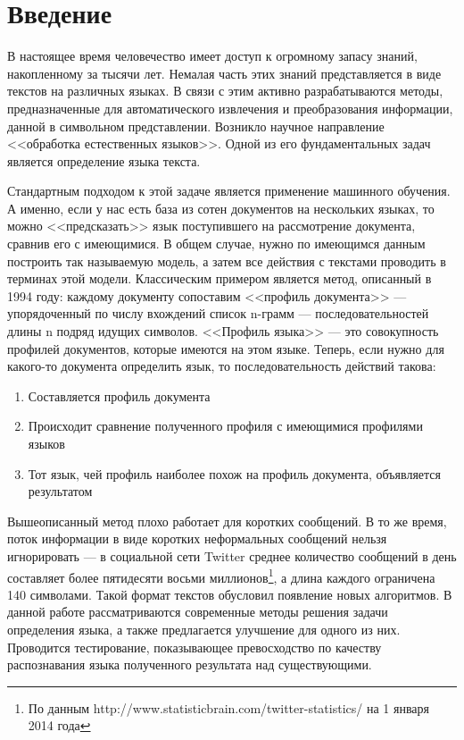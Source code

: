 \documentclass[a4paper, 14pt]{article}
\begin{document}
\newtheorem{definition} {Определение}
\newtheorem{option} {Свойство}
\newtheorem{theorem} {Теорема}


\section{Введение}
	        В настоящее время человечество имеет доступ к огромному запасу знаний, накопленному за тысячи лет. Немалая часть этих знаний представляется
	        в виде текстов на различных языках. В связи с этим активно разрабатываются методы, предназначенные для автоматического извлечения
	        и преобразования информации, данной в символьном представлении. 
	        Возникло научное направление <<обработка естественных языков>>. Одной из его фундаментальных задач является определение языка текста. 


	        Стандартным подходом к этой задаче является применение машинного обучения. А именно, если у нас есть база из сотен документов 
	        на нескольких языках, то можно <<предсказать>> язык поступившего на рассмотрение документа, сравнив его с имеющимися. 
	        В общем случае, нужно по имеющимся данным построить так называемую модель, а затем все действия с текстами проводить в терминах 
	        этой модели. 
	        Классическим примером является метод, описанный в 1994 году: каждому документу сопоставим <<профиль документа>> --- упорядоченный по
	        числу вхождений список n-грамм --- последовательностей длины n подряд идущих символов. <<Профиль языка>> --- это совокупность профилей
	        документов, которые имеются на этом языке. Теперь, если нужно для какого-то документа определить язык, то последовательность
	        действий такова:
	        \begin{enumerate}
	        		\item Составляется профиль документа
	        		\item Происходит сравнение полученного профиля с имеющимися профилями языков
	        		\item Тот язык, чей профиль наиболее похож на профиль документа, объявляется результатом
	        \end{enumerate}
	          
	        Вышеописанный метод плохо работает для коротких сообщений. В то же время, поток информации в виде коротких неформальных сообщений нельзя игнорировать ---
	        в социальной сети Twitter среднее количество сообщений в день составляет более пятидесяти восьми миллионов\footnote{По данным http://www.statisticbrain.com/twitter-statistics/ на 1 января 2014 года}, а длина каждого ограничена 140 символами. 
	        Такой формат текстов обусловил появление новых алгоритмов. В данной работе рассматриваются современные методы 
	        решения задачи определения языка, а также предлагается улучшение для одного из них. Проводится тестирование, показывающее
	        превосходство по качеству распознавания языка полученного результата над существующими.
  
\end{document}
